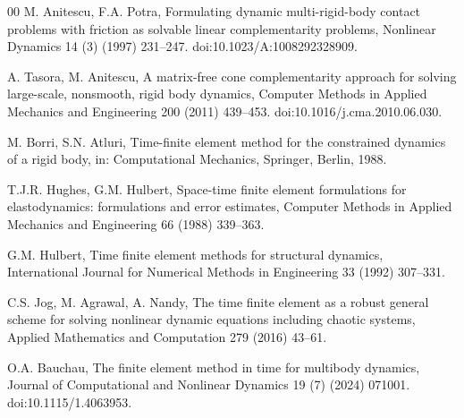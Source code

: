 \begin{thebibliography}{00}
M. Anitescu, F.A. Potra,
Formulating dynamic multi-rigid-body contact problems with friction as solvable linear
complementarity problems,
Nonlinear Dynamics 14 (3) (1997) 231--247.
doi:10.1023/A:1008292328909.

A. Tasora, M. Anitescu,
A matrix-free cone complementarity approach for solving large-scale, nonsmooth, rigid body
dynamics,
Computer Methods in Applied Mechanics and Engineering 200 (2011) 439--453.
doi:10.1016/j.cma.2010.06.030.

M. Borri, S.N. Atluri,
Time-finite element method for the constrained dynamics of a rigid body,
in: Computational Mechanics, Springer, Berlin, 1988.

T.J.R. Hughes, G.M. Hulbert,
Space-time finite element formulations for elastodynamics: formulations and error estimates,
Computer Methods in Applied Mechanics and Engineering 66 (1988) 339--363.

G.M. Hulbert,
Time finite element methods for structural dynamics,
International Journal for Numerical Methods in Engineering 33 (1992) 307--331.

C.S. Jog, M. Agrawal, A. Nandy,
The time finite element as a robust general scheme for solving nonlinear dynamic equations
including chaotic systems,
Applied Mathematics and Computation 279 (2016) 43--61.

O.A. Bauchau,
The finite element method in time for multibody dynamics,
Journal of Computational and Nonlinear Dynamics 19 (7) (2024) 071001.
doi:10.1115/1.4063953.

\end{thebibliography}


